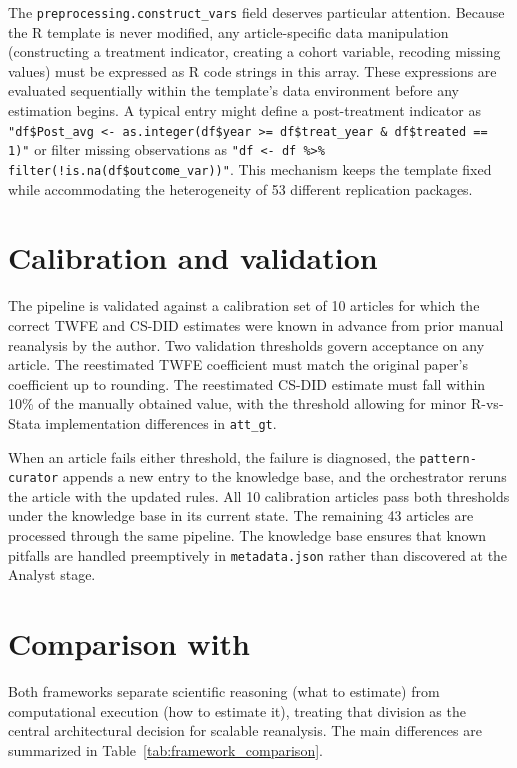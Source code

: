 The \texttt{preprocessing.construct\_vars} field deserves particular attention. Because the R template is never modified, any article-specific data manipulation (constructing a treatment indicator, creating a cohort variable, recoding missing values) must be expressed as R code strings in this array. These expressions are evaluated sequentially within the template's data environment before any estimation begins. A typical entry might define a post-treatment indicator as \verb|"df$Post_avg <- as.integer(df$year >= df$treat_year & df$treated == 1)"| or filter missing observations as \verb|"df <- df %>% filter(!is.na(df$outcome_var))"|. This mechanism keeps the template fixed while accommodating the heterogeneity of 53 different replication packages.


\section{Calibration and validation}
\label{sec:appc_calibration}

The pipeline is validated against a calibration set of 10 articles for which the correct TWFE and CS-DID estimates were known in advance from prior manual reanalysis by the author. Two validation thresholds govern acceptance on any article. The reestimated TWFE coefficient must match the original paper's coefficient up to rounding. The reestimated CS-DID estimate must fall within 10\% of the manually obtained value, with the threshold allowing for minor R-vs-Stata implementation differences in \texttt{att\_gt}.

When an article fails either threshold, the failure is diagnosed, the \texttt{pattern-curator} appends a new entry to the knowledge base, and the orchestrator reruns the article with the updated rules. All 10 calibration articles pass both thresholds under the knowledge base in its current state. The remaining 43 articles are processed through the same pipeline. The knowledge base ensures that known pitfalls are handled preemptively in \texttt{metadata.json} rather than discovered at the Analyst stage.


\section{Comparison with \texorpdfstring{\textcite{xu2026scaling}}{Xu and Yang (2026)}}
\label{sec:appc_xuyang}

Both frameworks separate scientific reasoning (what to estimate) from computational execution (how to estimate it), treating that division as the central architectural decision for scalable reanalysis. The main differences are summarized in Table~\ref{tab:framework_comparison}.

